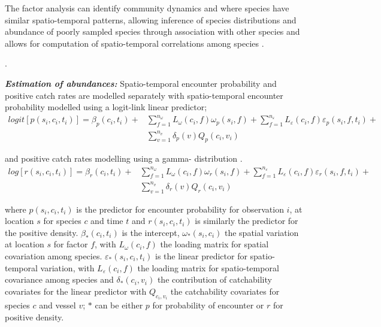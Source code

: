 \documentclass{nature}
\begin{document}
\begin{linenumbers}
The factor analysis can identify community dynamics and where species have
similar spatio-temporal patterns, allowing inference of species distributions
and abundance of poorly sampled species through association with other species
and allows for computation of spatio-temporal correlations among species
\cite{Thorson2016b}.

. 

\textbf{\textit{Estimation of abundances:}} Spatio-temporal encounter
probability and positive catch rates are modelled separately with
spatio-temporal encounter probability modelled using a logit-link linear
predictor;
		\begin{equation}
			\begin{split}
			logit[p(s_{i},c_{i},t_{i})] =	\beta_{p}(c_{i},t_{i}) +
			& \sum\limits_{f=1}^{n_{\omega}} L_{\omega}(c_{i},f)
			\omega_{p}(s_{i},f) + \sum\limits_{f=1}^{n_{\varepsilon}}
			L_{\varepsilon}(c_{i},f) \varepsilon_{p}(s_{i},f,t_{i}) + \\ 
			& \sum\limits_{v=1}^{n_{v}}\delta_{p}(v)Q_{p}(c_{i}, v_{i})
		\end{split}
		\end{equation}

and positive catch rates modelling using a gamma- distribution \cite{Thorson2015a}. 
		\begin{equation}
			\begin{split}
			log[r(s_{i},c_{i},t_{i})] = \beta_{r}(c_{i},t_{i}) +
			& \sum\limits_{f=1}^{n_{\omega}} L_{\omega}(c_{i},f)
			\omega_{r}(s_{i},f) +\sum\limits_{f=1}^{n_{\varepsilon}} 
			L_{\varepsilon}(c_{i},f) \varepsilon_{r}(s_{i},f,t_{i}) + \\
			& \sum\limits_{v=1}^{n_{v}}\delta_{r}(v) Q_{r}(c_{i}, v_{i})
			\end{split}
		\end{equation}

where $p(s_{i}, c_{i}, t_{i})$ is the predictor for encounter probability for
observation $i$, at location $s$ for species $c$ and time $t$ and $r(s_{i},
c_{i}, t_{i})$ is similarly the predictor for the positive density.
$\beta_{*}(c_{i},t_{i})$ is the intercept, $\omega_{*}(s_{i},c_{i})$ the
spatial variation at location $s$ for factor $f$, with $L_{\omega}(c_{i},f)$
the loading matrix for spatial covariation among species.
$\varepsilon_{*}(s_{i},c_{i},t_{i})$ is the linear predictor for
spatio-temporal variation, with $L_{\varepsilon}(c_{i}, f)$ the loading matrix
for spatio-temporal covariance among species and $\delta_{*}(c_{i}, v_{i})$ the
contribution of catchability covariates for the linear predictor with
$Q_{c_{i}, v_{i}}$ the catchability covariates for species $c$ and vessel $v$;
$*$ can be either $p$ for probability of encounter or $r$ for positive density.


\end{linenumbers}
\end{document}
